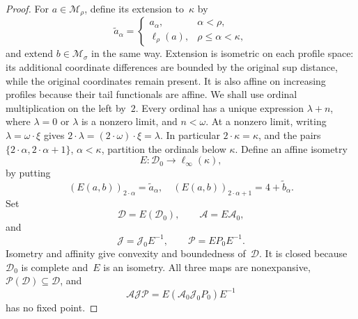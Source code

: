 \documentclass[preprint,12pt,nopreprintline]{elsarticle}
\theoremstyle{definition}
\theoremstyle{remark}
\numberwithin{equation}{section}
\begin{document}
\begin{proof}
For $a\in\mathcal M_\rho$, define its extension to~$\kappa$ by
\[
 \widetilde a_\alpha=
 \begin{cases}
  a_\alpha,&\alpha<\rho,\\
  \ell_\rho(a),&\rho\le\alpha<\kappa,
 \end{cases}
\]
and extend $b\in\mathcal M_\sigma$ in the same way. Extension is isometric on each profile space: its additional
coordinate differences are bounded by the original sup distance, while the original coordinates remain present. It is also affine
on increasing profiles because their tail functionals are affine. We shall use ordinal multiplication on the left by~$2$.
Every ordinal has a unique expression $\lambda+n$, where $\lambda=0$ or $\lambda$ is a nonzero limit, and $n<\omega$.
At a nonzero limit, writing $\lambda=\omega\cdot\xi$ gives $2\cdot\lambda=(2\cdot\omega)\cdot\xi=\lambda$.
In particular $2\cdot\kappa=\kappa$, and the pairs $\{2\cdot\alpha,2\cdot\alpha+1\}$, $\alpha<\kappa$, partition
the ordinals below $\kappa$. Define an affine isometry
\[
 E:\mathcal D_0\longrightarrow\ell_\infty(\kappa),
\]
by putting
\begin{equation}
 (E(a,b))_{2\cdot\alpha}=\widetilde a_\alpha,\quad
 (E(a,b))_{2\cdot\alpha+1}=4+\widetilde b_\alpha.
 \label{tcp:eq:encoding}
\end{equation}
Set
\begin{equation}
 \mathcal D=E(\mathcal D_0),\qquad
 \mathcal A=E\mathcal A_0, 
 \label{tcp:eq:encoded-maps}
\end{equation}
and
\begin{equation}
 \mathcal J=\mathcal J_0E^{-1},\qquad
 \mathscr P=EP_0E^{-1}.\label{tcp:eq:encoded-synthesis-propagator}
\end{equation}
Isometry and affinity give convexity and boundedness of~$\mathcal D$. It is closed because $\mathcal D_0$ is complete and~$E$ is an isometry. All three maps are nonexpansive, $\mathscr P(\mathcal D)\subseteq\mathcal D$, and
\[
 \mathcal A\mathcal J\mathscr P=E(\mathcal A_0\mathcal J_0P_0)E^{-1}
\]
has no fixed point.


\end{proof}
\end{document}
